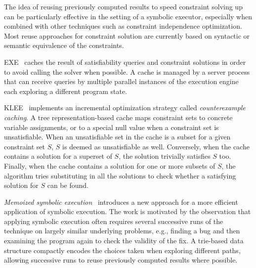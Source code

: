 

\medskip{} 
The idea of reusing previously computed results to speed constraint solving up can be particularly effective in the setting of a symbolic executor, especially when combined with other techniques such as constraint independence optimization. Most reuse approaches for constraint solution are currently based on syntactic or semantic equivalence of the constraints.

{\sc EXE}~\cite{EXE-CCS06} caches the result of satisfiability queries and constraint solutions in order to avoid calling the solver when possible. A cache is managed by a server process that can receive queries by multiple parallel instances of the execution engine each exploring a different program state.

{\sc KLEE}~\cite{KLEE-OSDI08} implements an incremental optimization strategy called {\em counterexample caching}. A tree representation-based cache maps constraint sets to concrete variable assignments, or to a special null value when a constraint set is unsatisfiable. When an unsatisfiable set in the cache is a subset for a given constraint set $S$, $S$ is deemed as unsatisfiable as well. Conversely, when the cache contains a solution for a superset of $S$, the solution trivially satisfies $S$ too. Finally, when the cache contains a solution for one or more subsets of $S$, the algorithm tries substituting in all the solutions to check whether a satisfying solution for $S$ can be found.

{\em Memoized symbolic execution}~\cite{MEMO-ISSTA12} introduces a new approach for a more efficient application of symbolic execution. The work is motivated by the observation that applying symbolic execution often requires several successive runs of the technique on largely similar underlying problems, e.g., finding a bug and then examining the program again to check the validity of the fix. A trie-based data structure compactly encodes the choices taken when exploring different paths, allowing successive runs to reuse previously computed results where possible.

